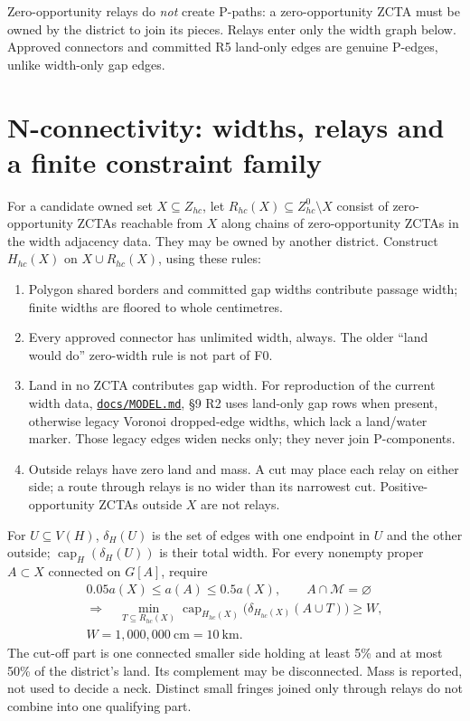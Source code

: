 \documentclass[11pt,letterpaper]{article}
\newcommand{\MODEL}{\href{MODEL.md}{\texttt{docs/MODEL.md}}}
\DeclareMathOperator{\capcut}{cap}
\begin{document}
Zero-opportunity relays do \emph{not} create P-paths: a zero-opportunity ZCTA
must be owned by the district to join its pieces. Relays enter only the
width graph below. Approved connectors and committed R5 land-only edges
are genuine P-edges, unlike width-only gap edges.

\section{N-connectivity: widths, relays and a finite constraint family}\label{sec:neck}
For a candidate owned set $X\subseteq Z_{hc}$, let
$R_{hc}(X)\subseteq Z^0_{hc}\setminus X$ consist of zero-opportunity ZCTAs
reachable from $X$ along chains of zero-opportunity ZCTAs in the width
adjacency data. They may be owned by another district. Construct
$H_{hc}(X)$ on $X\cup R_{hc}(X)$, using these rules:
\begin{enumerate}
\item Polygon shared borders and committed gap widths contribute passage
width; finite widths are floored to whole centimetres.
\item Every approved connector has unlimited width, always. The older
``land would do'' zero-width rule is not part of F0.
\item Land in no ZCTA contributes gap width. For reproduction of the current
width data, \MODEL, \S9 R2 uses land-only gap rows when present, otherwise
legacy Voronoi dropped-edge widths, which lack a land/water marker.
Those legacy edges widen necks only; they never join P-components.
\item Outside relays have zero land and mass. A cut may place each relay on
either side; a route through relays is no wider than its narrowest cut.
Positive-opportunity ZCTAs outside $X$ are not relays.
\end{enumerate}
For $U\subseteq V(H)$, $\delta_H(U)$ is the set of edges with one endpoint
in $U$ and the other outside; $\capcut_H(\delta_H(U))$ is their total width.
For every nonempty proper $A\subset X$ connected on $G[A]$, require
\begin{equation}\label{eq:neck}
\begin{gathered}
 0.05a(X)\le a(A)\le0.5a(X),\qquad A\cap\mathcal M=\varnothing\\
 \Longrightarrow\quad
 \min_{T\subseteq R_{hc}(X)}
 \capcut_{H_{hc}(X)}\bigl(\delta_{H_{hc}(X)}(A\cup T)\bigr)\ge W,\\
 W=1{,}000{,}000\ \mathrm{cm}=10\ \mathrm{km}.
\end{gathered}
\end{equation}
The cut-off part is one connected smaller side holding at least 5\% and
at most 50\% of the district's land. Its complement may be disconnected.
Mass is reported, not used to decide a neck. Distinct small fringes joined
only through relays do not combine into one qualifying part.
\end{document}
